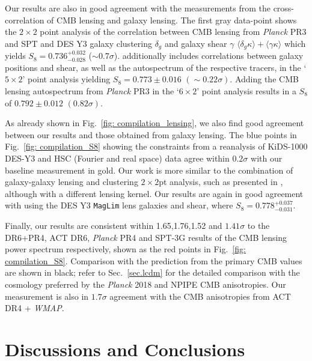 \documentclass[twocolumn]{aastex631}
\begin{document}
{Our results are also in good agreement with the measurements from the cross-correlation of CMB lensing and galaxy lensing. The first gray data-point shows the $2\times2$ point analysis of the correlation between CMB lensing from \textit{Planck} PR3 and SPT and DES Y3 galaxy clustering $\delta_g$ and galaxy shear $\gamma$ $\langle\delta_g\kappa\rangle+\langle\gamma\kappa\rangle$ \citep{2023PhRvD.107b3530C} which yields $S_8=0.736^{+0.032}_{-0.028}$ ($\sim0.7\sigma$). \cite{Abbott_2023} additionally includes correlations between galaxy positions and shear, as well as the autospectrum of the respective tracers, in the `$5\times2$' point analysis yielding $S_8=0.773\pm0.016$ $(\sim0.22\sigma)$. Adding the CMB lensing autospectrum from \textit{Planck} PR3 in the `$6\times2$' point analysis \citep{2023PhRvD.107b3530C} results in a  $S_8$ of $0.792\pm0.012$ $(0.82\sigma)$.

As already shown in Fig.~\ref{fig: compilation_lensing}, we also find good agreement between our results and those obtained from galaxy lensing. The blue points in Fig.~\ref{fig: compilation_S8} showing the constraints from a reanalysis of  KiDS-1000 DES-Y3 and HSC (Fourier and real space) data agree within $0.2\sigma$ with our baseline measurement in gold.
Our work is more similar to the combination of galaxy-galaxy lensing and clustering $2\times2$pt analysis, such as presented in \cite{2022PhRvD.106j3530P}, although with a different lensing kernel. Our results are again in good agreement with \cite{2022PhRvD.106j3530P} using the DES Y3 \texttt{MagLim} lens galaxies and shear, where $S_8=0.778^{+0.037}_{-0.031}$.

Finally, our results are consistent within 1.65,1.76,1.52 and $1.41\sigma$ to the DR6+PR4, ACT DR6, \textit{Planck} PR4 and SPT-3G results of the CMB lensing power spectrum respectively, shown as the red points in Fig.~\ref{fig: compilation_S8}. Comparison with the prediction from the primary CMB values are shown in black; refer to Sec.~\ref{sec.lcdm} for the detailed comparison with the cosmology preferred by the \textit{Planck} 2018 and NPIPE CMB anisotropies. Our measurement is also in $1.7\sigma$ agreement with the CMB anisotropies from ACT DR4 + \textit{WMAP}.










\section{Discussions and Conclusions} \label{sec.discussion}

}
\end{document}
